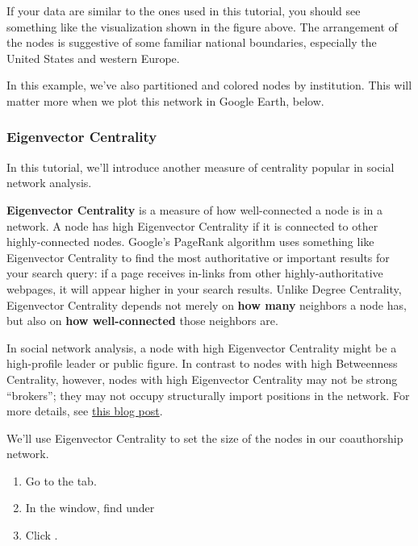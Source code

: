 \documentclass[letterpaper,10pt,english]{sphinxmanual}
\begin{document}
If your data are similar to the ones used in this tutorial, you should see something like
the visualization shown in the figure above. The arrangement of the nodes is suggestive of
some familiar national boundaries, especially the United States and western Europe.

In this example, we've also partitioned and colored nodes by institution. This will matter
more when we plot this network in Google Earth, below.


\subsubsection{Eigenvector Centrality}
\label{tutorial.geonetworks:eigenvector-centrality}
In this tutorial, we'll introduce another measure of centrality popular in social network
analysis.

\textbf{Eigenvector Centrality} is a measure of how well-connected a node is in a network.
A node has high Eigenvector Centrality if it is connected to other highly-connected nodes.
Google's PageRank algorithm uses something like Eigenvector Centrality to find the most
authoritative or important results for your search query: if a page receives in-links from
other highly-authoritative webpages, it will appear higher in your search results. Unlike
Degree Centrality, Eigenvector Centrality depends not merely on \textbf{how many} neighbors
a node has, but also on \textbf{how well-connected} those neighbors are.

In social network analysis, a node with high Eigenvector Centrality might be a
high-profile leader or public figure. In contrast to nodes with high Betweenness
Centrality, however, nodes with high Eigenvector Centrality may not be strong ``brokers'';
they may not occupy structurally import positions in the network. For more details, see
\href{http://www.activatenetworks.net/blog/who-is-central-to-a-social-network-it-depends-on-your-centrality-measure/}{this blog post}.

We'll use Eigenvector Centrality to set the size of the nodes in our coauthorship network.
\begin{enumerate}
\item {} 
Go to the  tab.

\item {} 
In the  window, find  under 

\item {} 
Click .

\end{enumerate}
\end{document}
